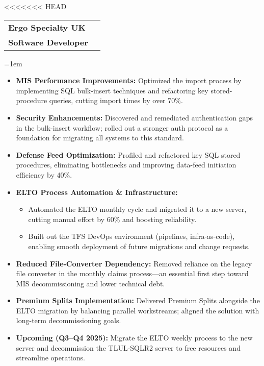 \documentclass[paper=a4,fontsize=11pt]{article}
\makeatletter
\newcommand{\EducationEntry}[4]{
	\noindent
	\begin{tabularx}{\textwidth}{@{}X r@{}}
		\textbf{\large\color{primary}#1} & \textbf{\color{secondary}#2} \\
		\textbf{\color{secondary}#3} & \\
	\end{tabularx}
	\vspace{4pt}
	\noindent\hangindent=1em\hangafter=0 #4
	\vspace{8pt}
}
\makeatother
\begin{document}
{\begin{itemize}
<<<<<<< HEAD
\EducationEntry{Ergo Specialty UK}{\textbf{\hspace{-2cm}{August2024–Present}}}{Software Developer}{
    \begin{itemize}
        \itemsep-0.1em 
        \item \textbf{MIS Performance Improvements:} Optimized the import process by implementing SQL bulk-insert techniques and refactoring key stored-procedure queries, cutting import times by over 70\%.
        \item \textbf{Security Enhancements:} Discovered and remediated authentication gaps in the bulk-insert workflow; rolled out a stronger auth protocol as a foundation for migrating all systems to this standard.
        \item \textbf{Defense Feed Optimization:} Profiled and refactored key SQL stored procedures, eliminating bottlenecks and improving data-feed initiation efficiency by 40\%.
        \item \textbf{ELTO Process Automation \& Infrastructure:}
            \begin{itemize}
                \item Automated the ELTO monthly cycle and migrated it to a new server, cutting manual effort by 60\% and boosting reliability.
                \item Built out the TFS DevOps environment (pipelines, infra-as-code), enabling smooth deployment of future migrations and change requests.
            \end{itemize}
        \item \textbf{Reduced File-Converter Dependency:} Removed reliance on the legacy file converter in the monthly claims process—an essential first step toward MIS decommissioning and lower technical debt.
        \item \textbf{Premium Splits Implementation:} Delivered Premium Splits alongside the ELTO migration by balancing parallel workstreams; aligned the solution with long-term decommissioning goals.
        \item \textbf{Upcoming (Q3–Q4 2025):} Migrate the ELTO weekly process to the new server and decommission the TLUL-SQLR2 server to free resources and streamline operations.
    \end{itemize}
}


\end{itemize}}
\end{document}
